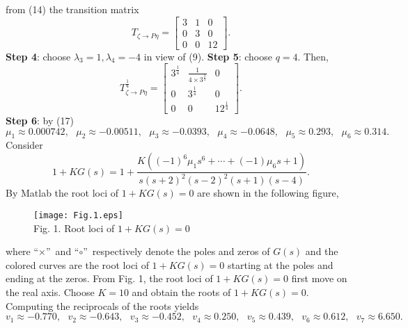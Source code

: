 \documentclass[journal,a4paper,12pt,onecolumn]{IEEEtran}
\begin{document}
from (14) the transition matrix\begin{equation*}
T_{\zeta \rightarrow P\eta }=\left[
\begin{array}{ccc}
3 & 1 & 0 \\
0 & 3 & 0 \\
0 & 0 & 12\end{array}\right] .
\end{equation*}\textbf{Step 4}: choose $\lambda _{3}=1,\lambda _{4}=-4$ in view of (9).
\textbf{Step 5}: choose $q=4$. Then,\begin{equation*}
T_{\zeta \rightarrow P\eta }^{\frac{1}{4}}=\left[
\begin{array}{ccc}
3^{\frac{1}{4}} & \frac{1}{4\times 3^{\frac{3}{4}}} & 0 \\
0 & 3^{\frac{1}{4}} & 0 \\
0 & 0 & 12^{\frac{1}{4}}\end{array}\right] .
\end{equation*}\textbf{Step 6}: by (17)\begin{equation*}
\mu _{1}\approx 0.000742,\text{ }\mu _{2}\approx -0.00511,\text{ }\mu
_{3}\approx -0.0393,\text{ }\mu _{4}\approx -0.0648,\text{ }\mu _{5}\approx
0.293,\text{ }\mu _{6}\approx 0.314.
\end{equation*}Consider\begin{equation*}
1+KG\left( s\right) =1+\frac{K\left( \left( -1\right) ^{6}\mu
_{1}s^{6}+\cdots +\left( -1\right) \mu _{6}s+1\right) }{s\left( s+2\right)
^{2}\left( s-2\right) ^{2}\left( s+1\right) \left( s-4\right) }.
\end{equation*}By Matlab the root loci of $1+KG\left( s\right) =0$ are shown in the
following figure,
\begin{figure}[h!]
\begin{center}
\texttt{[image: Fig.1.eps]} \\[0pt]
{\fontsize{11pt}{11.6pt} \selectfont Fig. 1. Root loci of $1+KG\left(
s\right) =0$}
\end{center}
\end{figure}
where \textquotedblleft $\times $\textquotedblright\ and \textquotedblleft $\circ $\textquotedblright\ respectively denote the poles and zeros of $G\left( s\right) $ and the colored curves are the root loci of $1+KG\left(
s\right) =0$ starting at the poles and ending at the zeros. From Fig. 1, the
root loci of $1+KG\left( s\right) =0$ first move on the real axis. Choose $K=10$ and obtain the roots of $1+KG\left( s\right) =0$. Computing the
reciprocals of the roots yields\begin{equation*}
v_{1}\approx -0.770,\text{ }v_{2}\approx -0.643,\text{ }v_{3}\approx -0.452,\text{ }v_{4}\approx 0.250,\text{ }v_{5}\approx 0.439,\text{ }v_{6}\approx
0.612,\text{ }v_{7}\approx 6.650.
\end{equation*}
\end{document}
